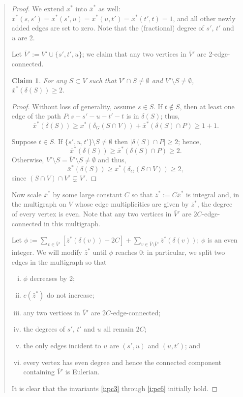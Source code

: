 \documentclass[11pt,letterpaper]{article}
\newtheorem{claim}{Claim}
\begin{document}
\begin{quote}
\begin{proof}
We extend $x^*$ into $\bar x^*$ as well: $\bar x^*(s,s')=\bar x^*(s',u)=\bar x^*(u,t')=\bar x^*(t',t)=1$, and all other newly added edges are set to zero. Note that the (fractional) degree of $s'$, $t'$ and $u$ are 2.

Let $\bar V':=V'\cup\{s',t',u\}$; we claim that any two vertices in $\bar V'$ are 2-edge-connected.
\begin{claim}\label{c:pc2}
For any $S\subset \bar V$ such that $\bar V'\cap S\neq \emptyset$ and $\bar V'\setminus S\neq \emptyset$, $\bar x^*(\delta(S))\geq 2$.
\end{claim}
\begin{proof}
Without loss of generality, assume $s\in S$. If $t\notin S$, then at least one edge of the path $P:s-s'-u-t'-t$ is in $\delta(S)$; thus,\[
\bar x^*(\delta(S))\geq x^*(\delta_G(S\cap V))+\bar x^*(\delta(S)\cap P)\geq 1+1
.\]

Suppose $t\in S$. If $\{s',u,t'\}\setminus S\neq\emptyset$ then $|\delta(S)\cap P|\geq 2$; hence,\[
\bar x^*(\delta(S))\geq \bar x^*(\delta(S)\cap P)\geq 2
.\]Otherwise, $V'\setminus S=\bar V'\setminus S\neq\emptyset$ and thus,\[
\bar x^*(\delta(S))\geq x^*(\delta_G(S\cap V))\geq 2
,\]since $(S\cap V)\cap V'\subsetneq V'$.
\end{proof}

Now scale $\bar x^*$ by some large constant $C$ so that $\bar z^*:=C\bar x^*$ is integral and, in the multigraph on $\bar V$ whose edge multiplicities are given by $\bar z^*$, the degree of every vertex is even. Note that any two vertices in $\bar V'$ are $2C$-edge-connected in this multigraph.

Let $\phi:=\sum_{v\in\bar V'} [\bar z^*(\delta(v))-2C] + \sum_{v\in \bar V\setminus \bar V'} \bar z^*(\delta(v))$; $\phi$ is an even integer. We will modify $\bar z^*$ until $\phi$ reaches 0: in particular, we split two edges in the multigraph so that\begin{enumerate}[(i)]
\item $\phi$ decreases by 2; \label{i:pc1}
\item $c(\bar z^*)$ do not increase; \label{i:pc2}
\item any two vertices in $\bar V'$ are $2C$-edge-connected; \label{i:pc3}
\item the degrees of $s'$, $t'$ and $u$ all remain $2C$; \label{i:pc4}
\item the only edges incident to $u$ are $(s',u)$ and $(u,t')$; and \label{i:pc5}
\item every vertex has even degree and hence the connected component containing $\bar V'$ is Eulerian. \label{i:pc6}
\end{enumerate}It is clear that the invariants \eqref{i:pc3} through \eqref{i:pc6} initially hold.


\end{proof}
\end{quote}
\end{document}
